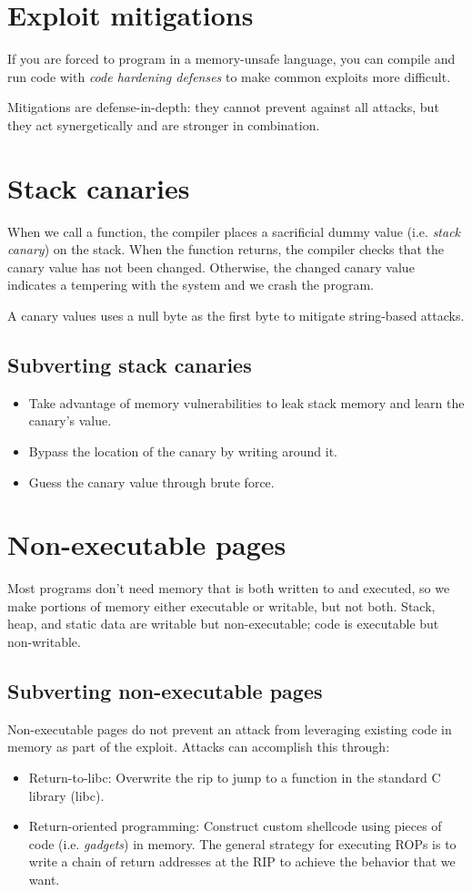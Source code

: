 \section{Exploit mitigations}
If you are forced to program in a memory-unsafe language, you can compile and run code with \emph{code hardening defenses} to make common exploits more difficult.

\medskip

Mitigations are defense-in-depth: they cannot prevent against all attacks, but they act synergetically and are stronger in combination.

\section{Stack canaries}
When we call a function, the compiler places a sacrificial dummy value (i.e. \emph{stack canary}) on the stack. When the function returns, the compiler checks that the canary value has not been changed. Otherwise, the changed canary value indicates a tempering with the system and we crash the program.

\medskip

A canary values uses a null byte as the first byte to mitigate string-based attacks.

\subsection{Subverting stack canaries}
\begin{itemize}
    \item Take advantage of memory vulnerabilities to leak stack memory and learn the canary's value.
    \item Bypass the location of the canary by writing around it.
    \item Guess the canary value through brute force.
\end{itemize}

\section{Non-executable pages}
Most programs don't need memory that is both written to and executed, so we make portions of memory either executable or writable, but not both. Stack, heap, and static data are writable but non-executable; code is executable but non-writable.

\subsection{Subverting non-executable pages}
Non-executable pages do not prevent an attack from leveraging existing code in memory as part of the exploit. Attacks can accomplish this through:
\begin{itemize}
    \item Return-to-libc: Overwrite the rip to jump to a function in the standard C library (libc).
    \item Return-oriented programming: Construct custom shellcode using pieces of code (i.e. \emph{gadgets}) in memory. The general strategy for executing ROPs is to write a chain of return addresses at the RIP to achieve the behavior that we want. 
\end{itemize}